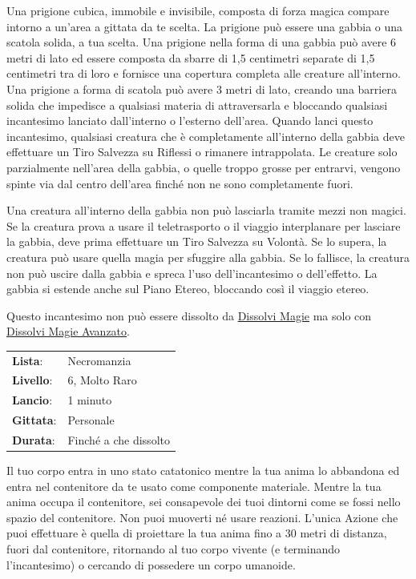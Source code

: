 \begin{multicols}{2}
Una prigione cubica, immobile e invisibile, composta di forza magica compare intorno a un'area a gittata da te scelta. La prigione può essere una gabbia o una scatola solida, a tua scelta. Una prigione nella forma di una gabbia può avere 6 metri di lato ed essere composta da sbarre di 1,5 centimetri separate di 1,5 centimetri tra di loro e fornisce una copertura completa alle creature all'interno. Una prigione a forma di scatola può avere 3 metri di lato, creando una barriera solida che impedisce a qualsiasi materia di attraversarla e bloccando qualsiasi incantesimo lanciato dall'interno o l'esterno dell'area. Quando lanci questo incantesimo, qualsiasi creatura che è completamente all'interno della gabbia deve effettuare un Tiro Salvezza su Riflessi o rimanere intrappolata. Le creature solo parzialmente nell'area della gabbia, o quelle troppo grosse per entrarvi, vengono spinte via dal centro dell'area finché non ne sono completamente fuori.

Una creatura all'interno della gabbia non può lasciarla tramite mezzi non magici. Se la creatura prova a usare il teletrasporto o il viaggio interplanare per lasciare la gabbia, deve prima effettuare un Tiro Salvezza su Volontà. Se lo supera, la creatura può usare quella magia per sfuggire alla gabbia. Se lo fallisce, la creatura non può uscire dalla gabbia e spreca l'uso dell'incantesimo o dell'effetto. La gabbia si estende anche sul Piano Etereo, bloccando così il viaggio etereo.

Questo incantesimo non può essere dissolto da \hyperlink{dissolvimagie}{Dissolvi Magie} ma solo con \hyperlink{dissolvimagieavanzato}{Dissolvi Magie Avanzato}.

\noindent\begin{tabularx}{\linewidth}{p{1.3cm}X}
	\rowcolor{gray!20}\textbf{Lista}: & Necromanzia \\
	\textbf{Livello}: & 6, Molto Raro \\
	\rowcolor{gray!20}\textbf{Lancio}: & 1 minuto \\
	\textbf{Gittata}: & Personale \\
	\rowcolor{gray!20}\textbf{Durata}: & Finché a che dissolto \\
\end{tabularx}\smallskip

Il tuo corpo entra in uno stato catatonico mentre la tua anima lo abbandona ed entra nel contenitore da te usato come componente materiale. Mentre la tua anima occupa il contenitore, sei consapevole dei tuoi dintorni come se fossi nello spazio del contenitore. Non puoi muoverti né usare reazioni. L'unica Azione che puoi effettuare è quella di proiettare la tua anima fino a 30 metri di distanza, fuori dal contenitore, ritornando al tuo corpo vivente (e terminando l'incantesimo) o cercando di possedere un corpo umanoide.


\end{multicols}
